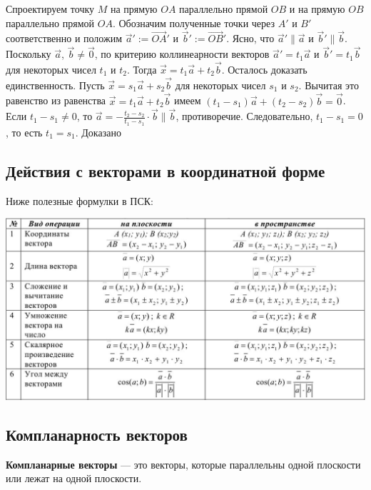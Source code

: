 \documentclass[a4paper]{article}
\begin{document}
    Спроектируем точку $M$ на прямую $OA$ параллельно прямой $OB$ и на прямую $OB$ параллельно прямой $OA$. Обозначим полученные точки через $A'$ и $B'$ соответственно и положим  $\vec{a}' := \overrightarrow{OA}'$ и $\vec{b}' := \overrightarrow{OB}'$. Ясно, что $\vec{a}' \parallel \vec{a}$ и $\vec{b}' \parallel \vec{b}$. Поскольку $\vec{a}$, $\vec{b} \neq \vec{0}$, по критерию коллинеарности векторов $\vec{a}' = t_1 \vec{a}$ и $\vec{b}' = t_1 \vec{b}$ для некоторых чисел $t_1$ и $t_2$.
    Тогда $\vec{x} = t_1 \vec{a} + t_2 \vec{b}$.
    Осталось доказать единственность. Пусть $\vec{x} = s_1 \vec{a} + s_2 \vec{b}$ для некоторых чисел $s_1$ и $s_2$.
    Вычитая это равенство из равенства $\vec{x} = t_1 \vec{a} + t_2 \vec{b}$
    имеем $(t_1 - s_1) \vec{a} + (t_2 - s_2) \vec{b} = \vec{0}$.
    Если $t_1-s_1 \neq 0$, то $\displaystyle \vec{a} = - \frac{t_2 - s_2}{t_1 - s_1} \cdot \vec{b} \parallel \vec{b}$, противоречие.
    Следовательно, $t_1 - s_1 = 0$, то есть $t_1 = s_1$. Доказано


    \subsection*{Действия с векторами в координатной форме}

	Ниже полезные формулки в ПСК:

    \includegraphics[width=18cm]{t2}

    \newpage \begin{center}
                 \begin{Large}
                 \end{Large}
    \end{center}
    \subsection*{Компланарность векторов}
    \textbf{Компланарные векторы} — это векторы, которые параллельны одной плоскости или лежат на одной плоскости.
\end{document}
